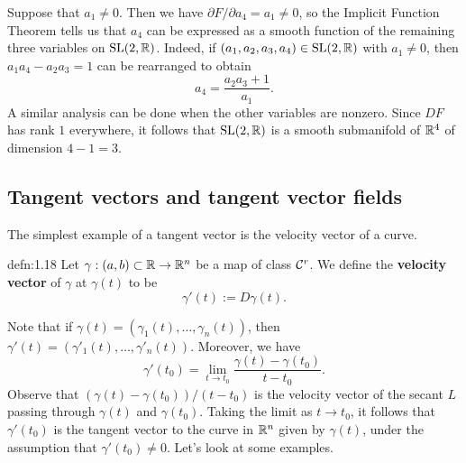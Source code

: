 Suppose that $a_1 \neq 0$. Then we have $\partial F/\partial a_4 = a_1 \neq 0$, 
so the Implicit Function Theorem tells us that $a_4$ can be expressed as a 
smooth function of the remaining three variables on $\operatorname{SL}(2, \mathbb{R})$. Indeed, if 
$(a_1, a_2, a_3, a_4) \in \operatorname{SL}(2, \mathbb{R})$ with $a_1 \neq 0$, then 
$a_1a_4 - a_2a_3 = 1$ can be rearranged to obtain 
\[ a_4 = \frac{a_2a_3 + 1}{a_1}. \] 
A similar analysis can be done when the other variables are nonzero. 
Since $DF$ has rank $1$ everywhere, it follows that $\operatorname{SL}(2, \mathbb{R})$ is a 
smooth submanifold of $\mathbb{R}^4$ of dimension $4-1 = 3$. 

\subsection{Tangent vectors and tangent vector fields} \label{subsec:1.5}
The simplest example of a tangent vector is the velocity vector of a curve. 

\begin{defn}{defn:1.18}
    Let $\gamma : (a, b) \subset \mathbb{R} \to \mathbb{R}^n$ be a map of class ${\cal C}^r$. 
    We define the {\bf velocity vector} of $\gamma$ at $\gamma(t)$ to be 
    \[ \gamma'(t) := D\gamma(t). \] 
\end{defn}\vspace{-0.25cm}

Note that if $\gamma(t) = (\gamma_1(t), \dots, \gamma_n(t))$, then 
$\gamma'(t) = (\gamma'_1(t), \dots, \gamma'_n(t))$. Moreover, we have 
\[ \gamma'(t_0) = \lim_{t\to t_0} \frac{\gamma(t) - \gamma(t_0)}{t - t_0}. \] 
Observe that $(\gamma(t) - \gamma(t_0))/(t - t_0)$ is the velocity vector 
of the secant $L$ passing through $\gamma(t)$ and $\gamma(t_0)$. 
Taking the limit as $t \to t_0$, it follows that $\gamma'(t_0)$ is the tangent 
vector to the curve in $\mathbb{R}^n$ given by $\gamma(t)$, under the assumption
that $\gamma'(t_0) \neq 0$. Let's look at some examples. 

